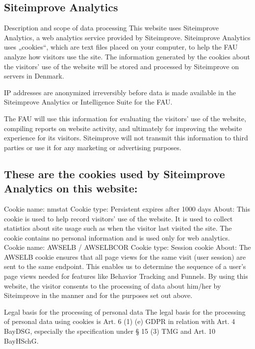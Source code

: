 \documentclass[letterpaper,10pt,english]{sphinxmanual}
\begin{document}
\subsection{Siteimprove Analytics}
\label{\detokenize{policies/legal:siteimprove-analytics}}
\sphinxAtStartPar
Description and scope of data processing
This website uses Siteimprove Analytics, a web analytics service provided by Siteimprove. Siteimprove Analytics uses „cookies“, which are text files placed on your computer, to help the FAU analyze how visitors use the site. The information generated by the cookies about the visitors’ use of the website will be stored and processed by Siteimprove on servers in Denmark.

\sphinxAtStartPar
IP addresses are anonymized irreversibly before data is made available in the Siteimprove Analytics or Intelligence Suite for the FAU.

\sphinxAtStartPar
The FAU will use this information for evaluating the visitors’ use of the website, compiling reports on website activity, and ultimately for improving the website experience for its visitors. Siteimprove will not transmit this information to third parties or use it for any marketing or advertising purposes.


\subsection{These are the cookies used by Siteimprove Analytics on this website:}
\label{\detokenize{policies/legal:these-are-the-cookies-used-by-siteimprove-analytics-on-this-website}}
\sphinxAtStartPar
Cookie name: nmstat
Cookie type: Persistent \sphinxhyphen{} expires after 1000 days
About: This cookie is used to help record visitors’ use of the website. It is used to collect statistics about site usage such as when the visitor last visited the site. The cookie contains no personal information and is used only for web analytics.
Cookie name: AWSELB / AWSELBCOR
Cookie type: Session cookie
About: The AWSELB cookie ensures that all page views for the same visit (user session) are sent to the same endpoint. This enables us to determine the sequence of a user’s page views needed for features like Behavior Tracking and Funnels.
By using this website, the visitor consents to the processing of data about him/her by Siteimprove in the manner and for the purposes set out above.

\sphinxAtStartPar
Legal basis for the processing of personal data
The legal basis for the processing of personal data using cookies is Art. 6 (1) (e) GDPR in relation with Art. 4 BayDSG, especially the specification under \S{} 15 (3) TMG and Art. 10 BayHSchG.
\end{document}
